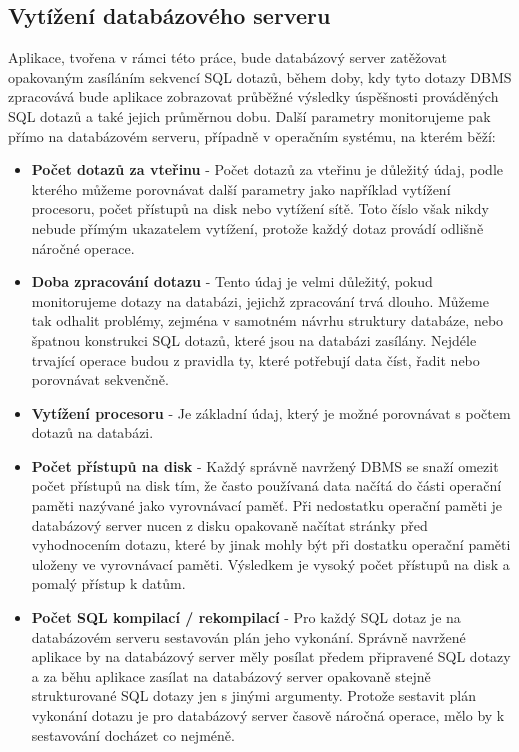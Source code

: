 \documentclass[czech,bachelor,public,dept460,male,cpdeclaration,twoside]{diploma}
\begin{document}
\subsection{Vytížení databázového serveru}
Aplikace, tvořena v rámci této práce, bude databázový server zatěžovat opakovaným zasíláním sekvencí SQL dotazů, během doby, kdy tyto dotazy DBMS zpracovává bude aplikace zobrazovat průběžné výsledky úspěšnosti prováděných SQL dotazů a také jejich průměrnou dobu. Další parametry monitorujeme pak přímo na databázovém serveru, případně v operačním systému, na kterém běží:
\begin{itemize}
  \item \textbf{Počet dotazů za vteřinu} - Počet dotazů za vteřinu je důležitý údaj, podle kterého můžeme porovnávat další parametry jako například vytížení procesoru, počet přístupů na disk nebo vytížení sítě. Toto číslo však nikdy nebude přímým ukazatelem vytížení, protože každý dotaz provádí odlišně náročné operace.
  \item \textbf{Doba zpracování dotazu} - Tento údaj je velmi důležitý, pokud monitorujeme dotazy na databázi, jejichž zpracování trvá dlouho. Můžeme tak odhalit problémy, zejména v samotném návrhu struktury databáze, nebo špatnou konstrukci SQL dotazů, které jsou na databázi zasílány. Nejdéle trvající operace budou z pravidla ty, které potřebují data číst, řadit nebo porovnávat sekvenčně.
  \item \textbf{Vytížení procesoru} - Je základní údaj, který je možné porovnávat s počtem dotazů na databázi. 
  \item \textbf{Počet přístupů na disk} - Každý správně navržený DBMS se snaží omezit počet přístupů na disk tím, že často používaná data načítá do části operační paměti nazývané jako vyrovnávací paměť. Při nedostatku operační paměti je databázový server nucen z disku opakovaně načítat stránky před vyhodnocením dotazu, které by jinak mohly být při dostatku operační paměti uloženy ve vyrovnávací paměti. Výsledkem je vysoký počet přístupů na disk a pomalý přístup k datům.
  \item \textbf{Počet SQL kompilací / rekompilací} - Pro každý SQL dotaz je na databázovém serveru sestavován plán jeho vykonání. Správně navržené aplikace by na databázový server měly posílat předem připravené SQL dotazy a za běhu aplikace zasílat na databázový server opakovaně stejně strukturované SQL dotazy jen s jinými argumenty. Protože sestavit plán vykonání dotazu je pro databázový server časově náročná operace, mělo by k sestavování docházet co nejméně. 

\end{itemize}
\end{document}
